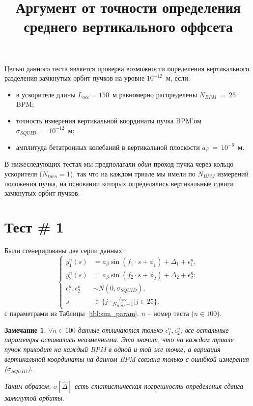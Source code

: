 \documentclass[12pt]{report}
\title{Аргумент от точности определения среднего вертикального оффсета}
\newcommand{\sigSQUID}{\sigma_{SQUID}}
\newcommand{\Ab}{a_{\beta}}
\newcommand{\ntrl}{n}
\newtheorem{rmk}{Замечание}
\begin{document}
	\maketitle
	
Целью данного теста является проверка возможности определения вертикального разделения замкнутых орбит пучков на уровне $10^{-12}$~м, если:
\begin{itemize}
	\item в ускорителе длины $L_{acc} = 150$~м равномерно распределены $N_{BPM}~=~25$ BPM;
	\item точность измерения вертикальной координаты пучка BPM'ом $\sigSQUID~=~10^{-12}$~м;
	\item амплитуда бетатронных колебаний в вертикальной плоскости $\Ab~=~10^{-6}$~м.
\end{itemize}

В нижеследующих тестах мы предполагали \emph{один} проход пучка через кольцо ускорителя ($N_{turn}=1$), так что на каждом триале мы имели по $N_{BPM}$ измерений положения пучка, на основании которых определялись вертикальные сдвиги замкнутых орбит пучков.

\section{Тест \# 1}
Были сгенерированы две серии данных:
\begin{equation}\label{eq:data}
	\begin{cases}
		y_1^{\ntrl}(s) &= \Ab\sin(f_1\cdot s + \phi_1) + \Delta_1 + \epsilon_1^{\ntrl},\\
		y_2^{\ntrl}(s) &= \Ab\sin(f_2\cdot s + \phi_2) + \Delta_2 + \epsilon_2^{\ntrl};\\
		\epsilon_1^{\ntrl},\epsilon_2^{\ntrl}&\sim N(0,\sigSQUID), \\
		s &\in \{j\cdot\frac{L_{acc}}{N_{BPM}-1}| j \in 25\}.
	\end{cases}
\end{equation}
с параметрами из Таблицы~\ref{tbl:sim_param}. $\ntrl$ -- номер теста ($\ntrl\in100$).

\begin{rmk}
	$\forall\ntrl\in100$ данные отличаются только $\epsilon_1^{\ntrl},\epsilon_2^{\ntrl}$; все остальные параметры оставались неизменными. Это значит, что на каждом триале пучок приходит на каждый BPM в одной и той же точке, а вариация вертикальной координаты на данном BPM связана только с ошибкой измерения ($\sigma_{SQUID}$).
	
	Таким образом, $\sigma[\hat{\Delta}]$ есть \emph{статистическая} погрешность определения сдвига замкнутой орбиты.
\end{rmk}
\end{document}
